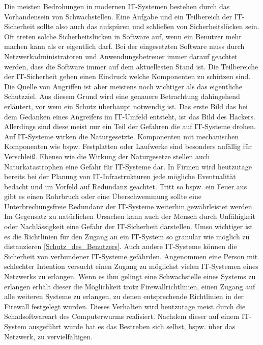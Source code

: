 Die meisten Bedrohungen in modernen IT-Systemen bestehen durch das Vorhandensein von Schwachstellen. Eine Aufgabe und ein Teilbereich der IT-Sicherheit sollte also auch 
das aufspüren und schließen von Sicherheitslücken sein. Oft treten solche Sicherheitslücken in Software auf, wenn ein Benutzer mehr machen kann als er eigentlich darf. 
Bei der eingesetzten Software muss durch Netzwerkadministratoren und Anwendungsbetreuer immer darauf geachtet werden, dass die Software immer auf dem aktuellesten Stand ist. 
\newline
Die Teilbereiche der IT-Sicherheit geben einen Eindruck welche Komponenten zu schützen sind. 
Die Quelle von Angriffen ist aber meistens noch wichtiger als das eigentliche Schutzziel. Aus diesem Grund wird eine genauere Betrachtung dahingehend 
erläutert, vor wem ein Schutz überhaupt notwendig ist. 
\newline
Das erste Bild das bei dem Gedanken eines Angreifers im IT-Umfeld entsteht, ist das Bild des Hackers. Allerdings sind diese meist nur ein Teil der Gefahren die auf IT-Systeme drohen. 
Auf IT-Systeme wirken die Naturgesetzte. Komponenten mit mechanischen Komponenten wie bspw. Festplatten oder Laufwerke sind besonders anfällig für Verschleiß. 
Ebenso wie die Wirkung der Naturgesetze stellen auch Naturkatastrophen eine Gefahr für IT-Systeme dar. In Firmen wird heutzutage bereits bei der Planung von 
IT-Infrastrukturen jede mögliche Eventualität bedacht und im Vorfeld auf Redundanz geachtet. Tritt so bspw. ein Feuer aus gibt es einen Rohrbruch oder eine Überschwemmung sollte 
eine Unterbrechungsfreie Redundanz der IT-Systeme weiterhin gewährleistet werden. 
\newline
Im Gegensatz zu natürlichen Ursachen kann auch der Mensch durch Unfähigkeit oder Nachlässigkeit eine Gefahr der IT-Sicherheit darstellen. 
Umso wichtiger ist es die Richtlinien für den Zugang an ein IT-System so granular wie möglich zu distanzieren \autoref{Schutz_des_Benutzers}.
\newline 
Auch andere IT-Systeme können die Sicherheit von verbundener IT-Systeme gefährden. Angenommen eine Person mit schlechter Intention versucht einen Zugang zu möglichst vielen 
IT-Systemen eines Netzwerks zu erlangen. Wenn es ihm gelingt eine Schwachstelle eines Systems zu erlangen erhält dieser die Möglichkeit trotz Firewallrichtlinien, einen Zugang 
auf alle weiteren Systeme zu erlangen, zu denen entsprechende Richtlinien in der Firewall festgelegt wurden. Dieses Verhalten wird heutzutage meist durch die Schadsoftwareart des 
\glqq Computerwurms \grqq{} realisiert. Nachdem dieser auf einem IT-System ausgeführt wurde hat es das Bestreben sich selbst, bspw. über das Netzwerk, zu vervielfältigen.
